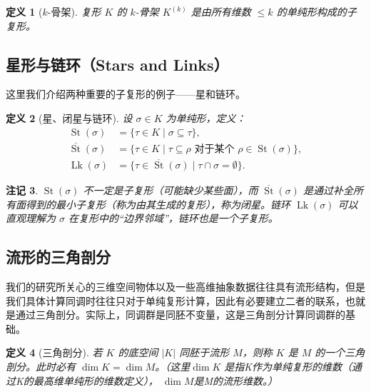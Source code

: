 \documentclass[UTF8]{ctexart}
\newtheorem{definition}{定义}[section]
\newtheorem{remark}[definition]{注记}
\begin{document}
\begin{definition}[\(k\)-骨架]
\label{def:skeleton}
复形 \(K\) 的 \(k\)-骨架 \(K^{(k)}\) 是由所有维数 \(\le k\) 的单纯形构成的子复形。
\end{definition}

\subsection{星形与链环（Stars and Links）}
\label{subsec:stars-links}
这里我们介绍两种重要的子复形的例子——星和链环。
\begin{definition}[星、闭星与链环]
\label{def:star-link}
设 \(\sigma \in K\) 为单纯形，定义：
\begin{align*}
    \operatorname{St}(\sigma) &= \{\tau \in K \mid \sigma \subseteq \tau\}, \\
    \overline{\operatorname{St}}(\sigma) &= \{\tau \in K \mid \tau \subseteq \rho \text{ 对于某个 } \rho \in \operatorname{St}(\sigma)\}, \\
    \operatorname{Lk}(\sigma) &= \{\tau \in \overline{\operatorname{St}}(\sigma) \mid \tau \cap \sigma = \emptyset\}.
\end{align*}
\end{definition}

\begin{remark}
\(\operatorname{St}(\sigma)\) 不一定是子复形（可能缺少某些面），而 \(\overline{\operatorname{St}}(\sigma)\) 是通过补全所有面得到的最小子复形（称为由其生成的复形），称为闭星。链环 \(\operatorname{Lk}(\sigma)\) 可以直观理解为 \(\sigma\) 在复形中的“边界邻域”，链环也是一个子复形。
\end{remark}

\subsection{流形的三角剖分}
\label{subsec:triangulation}
我们的研究所关心的三维空间物体以及一些高维抽象数据往往具有流形结构，但是我们具体计算同调时往往只对于单纯复形计算，因此有必要建立二者的联系，也就是通过三角剖分。实际上，同调群是同胚不变量，这是三角剖分计算同调群的基础。
\begin{definition}[三角剖分]
\label{def:triangulation}
若 \(K\) 的底空间 \(|K|\) 同胚于流形 \(M\)，则称 \(K\) 是 \(M\) 的一个三角剖分。此时必有 \(\dim K = \dim M\)。（这里$\dim K$ 是指K作为单纯复形的维数（通过K的最高维单纯形的维数定义）， $\dim M$是M的流形维数。）
\end{definition}
\end{document}
